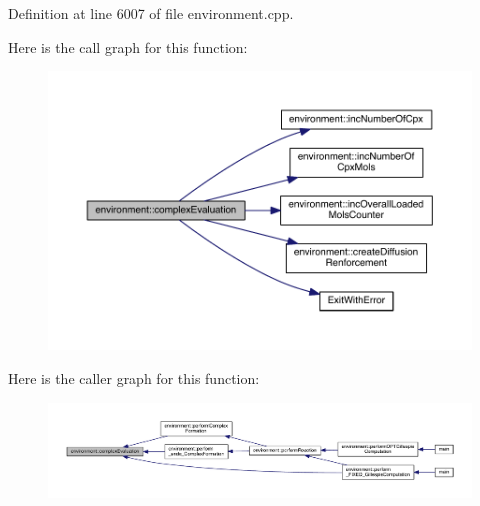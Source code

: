 Definition at line 6007 of file environment.\-cpp.



Here is the call graph for this function\-:
\nopagebreak
\begin{figure}[H]
\begin{center}
\leavevmode
\includegraphics[width=350pt]{a00014_a5ee6b203f077de1467aa72042814db7d_cgraph}
\end{center}
\end{figure}




Here is the caller graph for this function\-:
\nopagebreak
\begin{figure}[H]
\begin{center}
\leavevmode
\includegraphics[width=350pt]{a00014_a5ee6b203f077de1467aa72042814db7d_icgraph}
\end{center}
\end{figure}


